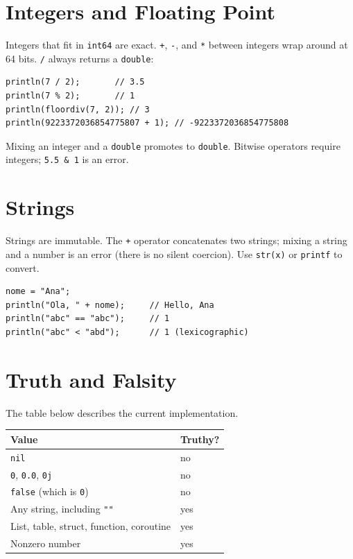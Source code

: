 \documentclass[11pt,a4paper,oneside]{report}
\newcommand{\code}[1]{\texttt{#1}}
\begin{document}
\section{Integers and Floating Point}
Integers that fit in \code{int64} are exact. \code{+}, \code{-}, and
\code{*} between integers wrap around at 64 bits. \code{/} always
returns a \code{double}:

\begin{lstlisting}
println(7 / 2);       // 3.5
println(7 % 2);       // 1
println(floordiv(7, 2)); // 3
println(9223372036854775807 + 1); // -9223372036854775808
\end{lstlisting}

Mixing an integer and a \code{double} promotes to \code{double}. Bitwise
operators require integers; \code{5.5 \& 1} is an error.

\section{Strings}
Strings are immutable. The \code{+} operator concatenates two strings;
mixing a string and a number is an error (there is no silent coercion).
Use \code{str(x)} or \code{printf} to convert.

\begin{lstlisting}
nome = "Ana";
println("Ola, " + nome);     // Hello, Ana
println("abc" == "abc");     // 1
println("abc" < "abd");      // 1 (lexicographic)
\end{lstlisting}

\section{Truth and Falsity}
The table below describes the current implementation.

\begin{center}
\begin{tabular}{L{7cm}L{7cm}}
\toprule
Value & Truthy? \\
\midrule
\code{nil} & no \\
\code{0}, \code{0.0}, \code{0j} & no \\
\code{false} (which is \code{0}) & no \\
Any string, including \code{""} & yes \\
List, table, struct, function, coroutine & yes \\
Nonzero number & yes \\
\bottomrule
\end{tabular}
\end{center}
\end{document}
